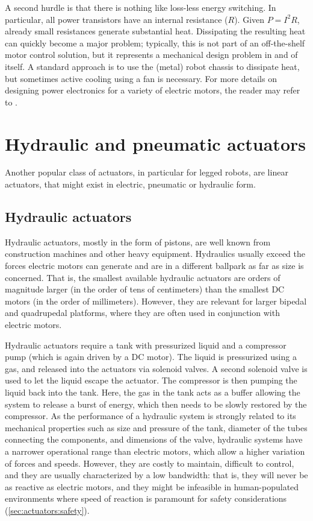 A second hurdle is that there is nothing like loss-less energy switching. In particular, all power transistors have an internal resistance ($R$). Given $P=I^2R$, already small resistances generate substantial heat. Dissipating the resulting heat can quickly become a major problem; typically, this is not part of an off-the-shelf motor control solution, but it represents a mechanical design problem in and of itself. A standard approach is to use the (metal) robot chassis to dissipate heat, but sometimes active cooling using a fan is necessary. For more details on designing power electronics for a variety of electric motors, the reader may refer to \cite{hughes2019electric}.

\section{Hydraulic and pneumatic actuators}

Another popular class of actuators, in particular for legged robots, are linear actuators, that might exist in electric, pneumatic or hydraulic form.

\subsection{Hydraulic actuators}

Hydraulic actuators, mostly in the form of pistons, are well known from construction machines and other heavy equipment. Hydraulics usually exceed the forces electric motors can generate and are in a different ballpark as far as size is concerned. That is, the smallest available hydraulic actuators are orders of magnitude larger (in the order of tens of centimeters) than the smallest DC motors (in the order of millimeters). However, they are relevant for larger bipedal and quadrupedal platforms, where they are often used in conjunction with electric motors.

Hydraulic actuators require a tank with pressurized liquid and a compressor pump (which is again driven by a DC motor). The liquid is pressurized using a gas, and released into the actuators via solenoid valves. A second solenoid valve is used to let the liquid escape the actuator. The compressor is then pumping the liquid back into the tank. Here, the gas in the tank acts as a buffer allowing the system to release a burst of energy, which then needs to be slowly restored by the compressor. As the performance of a hydraulic system is strongly related to its mechanical properties such as size and pressure of the tank, diameter of the tubes connecting the components, and dimensions of the valve, hydraulic systems have a narrower operational range than electric motors, which allow a higher variation of forces and speeds.
However, they are costly to maintain, difficult to control, and they are usually characterized by a low bandwidth: that is, they will never be as reactive as electric motors, and they might be infeasible in human-populated environments where speed of reaction is paramount for safety considerations (\cref{sec:actuators:safety}).

